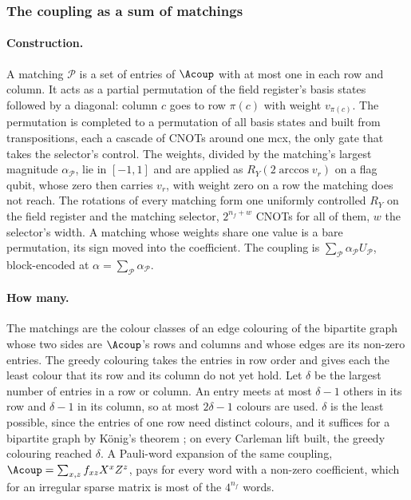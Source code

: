 \subsubsection{The coupling as a sum of matchings}
\label{app:matchings}

\paragraph{Construction.} A matching $\mathcal{P}$ is a set of entries of $\Acoup$ with at most one in each row and column. It acts as a partial permutation of the field register's basis states followed by a diagonal: column $c$ goes to row $\pi(c)$ with weight $v_{\pi(c)}$. The permutation is completed to a permutation of all basis states and built from transpositions, each a cascade of CNOTs around one \gls{mcx}, the only gate that takes the selector's control. The weights, divided by the matching's largest magnitude $\alpha_{\mathcal P}$, lie in $[-1,1]$ and are applied as $R_Y(2\arccos v_r)$ on a flag qubit, whose zero then carries $v_r$, with weight zero on a row the matching does not reach. The rotations of every matching form one uniformly controlled $R_Y$ on the field register and the matching selector, $2^{n_f+w}$ CNOTs for all of them, $w$ the selector's width. A matching whose weights share one value is a bare permutation, its sign moved into the coefficient. The coupling is $\sum_{\mathcal P}\alpha_{\mathcal P}U_{\mathcal P}$, block-encoded at $\alpha=\sum_{\mathcal P}\alpha_{\mathcal P}$.

\paragraph{How many.} The matchings are the colour classes of an edge colouring of the bipartite graph whose two sides are $\Acoup$'s rows and columns and whose edges are its non-zero entries. The greedy colouring takes the entries in row order and gives each the least colour that its row and its column do not yet hold. Let $\delta$ be the largest number of entries in a row or column. An entry meets at most $\delta-1$ others in its row and $\delta-1$ in its column, so at most $2\delta-1$ colours are used. $\delta$ is the least possible, since the entries of one row need distinct colours, and it suffices for a bipartite graph by K\"onig's theorem \cite{konig1916graphen}; on every Carleman lift built, the greedy colouring reached $\delta$. A Pauli-word expansion of the same coupling, $\Acoup=\sum_{x,z}f_{xz}X^xZ^z$, pays for every word with a non-zero coefficient, which for an irregular sparse matrix is most of the $4^{n_f}$ words.


